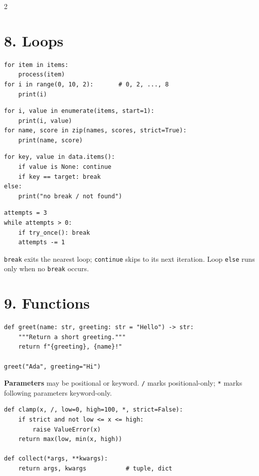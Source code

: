 \documentclass[10pt,a4paper]{article}
\newcommand{\py}[1]{\texttt{#1}}
\begin{document}
\begin{multicols}{2}
\section{8. Loops}

\begin{lstlisting}
for item in items:
    process(item)
for i in range(0, 10, 2):       # 0, 2, ..., 8
    print(i)
\end{lstlisting}

\begin{lstlisting}
for i, value in enumerate(items, start=1):
    print(i, value)
for name, score in zip(names, scores, strict=True):
    print(name, score)
\end{lstlisting}

\begin{lstlisting}
for key, value in data.items():
    if value is None: continue
    if key == target: break
else:
    print("no break / not found")
\end{lstlisting}

\begin{lstlisting}
attempts = 3
while attempts > 0:
    if try_once(): break
    attempts -= 1
\end{lstlisting}

\py{break} exits the nearest loop; \py{continue} skips to its next iteration. Loop \py{else} runs only when no \py{break} occurs.

\section{9. Functions}

\begin{lstlisting}
def greet(name: str, greeting: str = "Hello") -> str:
    """Return a short greeting."""
    return f"{greeting}, {name}!"

greet("Ada", greeting="Hi")
\end{lstlisting}

\textbf{Parameters} may be positional or keyword. \py{/} marks positional-only; \py{*} marks following parameters keyword-only.

\begin{lstlisting}
def clamp(x, /, low=0, high=100, *, strict=False):
    if strict and not low <= x <= high:
        raise ValueError(x)
    return max(low, min(x, high))

def collect(*args, **kwargs):
    return args, kwargs           # tuple, dict
\end{lstlisting}


\end{multicols}
\end{document}
